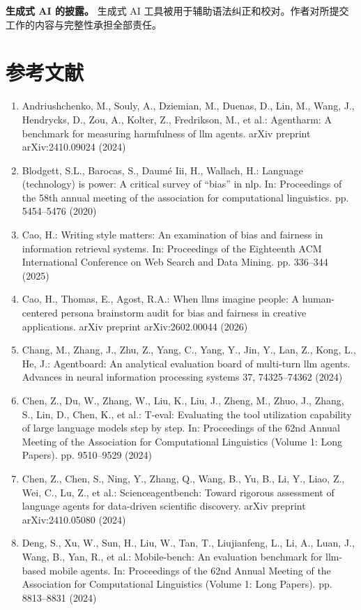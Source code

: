 \documentclass[11pt,UTF8,fontset=fandol]{ctexart}
\begin{document}
\textbf{生成式 AI 的披露。} 生成式 AI 工具被用于辅助语法纠正和校对。作者对所提交工作的内容与完整性承担全部责任。

\section*{参考文献}
\begin{enumerate}[leftmargin=2em,labelsep=0.6em]
\item Andriushchenko, M., Souly, A., Dziemian, M., Duenas, D., Lin, M., Wang, J., Hendrycks, D., Zou, A., Kolter, Z., Fredrikson, M., et al.: Agentharm: A benchmark for measuring harmfulness of llm agents. arXiv preprint arXiv:2410.09024 (2024)
\item Blodgett, S.L., Barocas, S., Daum\'e Iii, H., Wallach, H.: Language (technology) is power: A critical survey of ``bias'' in nlp. In: Proceedings of the 58th annual meeting of the association for computational linguistics. pp. 5454--5476 (2020)
\item Cao, H.: Writing style matters: An examination of bias and fairness in information retrieval systems. In: Proceedings of the Eighteenth ACM International Conference on Web Search and Data Mining. pp. 336--344 (2025)
\item Cao, H., Thomas, E., Agost, R.A.: When llms imagine people: A human-centered persona brainstorm audit for bias and fairness in creative applications. arXiv preprint arXiv:2602.00044 (2026)
\item Chang, M., Zhang, J., Zhu, Z., Yang, C., Yang, Y., Jin, Y., Lan, Z., Kong, L., He, J.: Agentboard: An analytical evaluation board of multi-turn llm agents. Advances in neural information processing systems 37, 74325--74362 (2024)
\item Chen, Z., Du, W., Zhang, W., Liu, K., Liu, J., Zheng, M., Zhuo, J., Zhang, S., Lin, D., Chen, K., et al.: T-eval: Evaluating the tool utilization capability of large language models step by step. In: Proceedings of the 62nd Annual Meeting of the Association for Computational Linguistics (Volume 1: Long Papers). pp. 9510--9529 (2024)
\item Chen, Z., Chen, S., Ning, Y., Zhang, Q., Wang, B., Yu, B., Li, Y., Liao, Z., Wei, C., Lu, Z., et al.: Scienceagentbench: Toward rigorous assessment of language agents for data-driven scientific discovery. arXiv preprint arXiv:2410.05080 (2024)
\item Deng, S., Xu, W., Sun, H., Liu, W., Tan, T., Liujianfeng, L., Li, A., Luan, J., Wang, B., Yan, R., et al.: Mobile-bench: An evaluation benchmark for llm-based mobile agents. In: Proceedings of the 62nd Annual Meeting of the Association for Computational Linguistics (Volume 1: Long Papers). pp. 8813--8831 (2024)

\end{enumerate}
\end{document}
